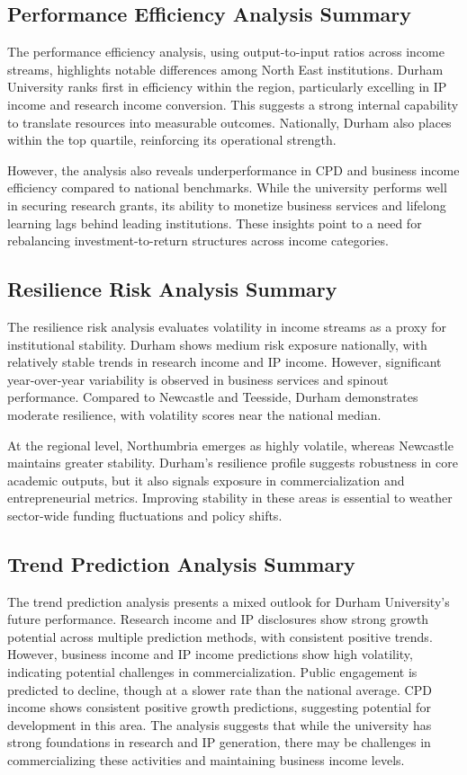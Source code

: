 \documentclass[journal,onecolumn, 10pt,draftclsnofoot]{IEEEtran}
\begin{document}
\subsection{Performance Efficiency Analysis Summary}

The performance efficiency analysis, using output-to-input ratios across income streams, highlights notable differences among North East institutions. Durham University ranks first in efficiency within the region, particularly excelling in IP income and research income conversion. This suggests a strong internal capability to translate resources into measurable outcomes. Nationally, Durham also places within the top quartile, reinforcing its operational strength.

However, the analysis also reveals underperformance in CPD and business income efficiency compared to national benchmarks. While the university performs well in securing research grants, its ability to monetize business services and lifelong learning lags behind leading institutions. These insights point to a need for rebalancing investment-to-return structures across income categories.

\subsection{Resilience Risk Analysis Summary}

The resilience risk analysis evaluates volatility in income streams as a proxy for institutional stability. Durham shows medium risk exposure nationally, with relatively stable trends in research income and IP income. However, significant year-over-year variability is observed in business services and spinout performance. Compared to Newcastle and Teesside, Durham demonstrates moderate resilience, with volatility scores near the national median.

At the regional level, Northumbria emerges as highly volatile, whereas Newcastle maintains greater stability. Durham's resilience profile suggests robustness in core academic outputs, but it also signals exposure in commercialization and entrepreneurial metrics. Improving stability in these areas is essential to weather sector-wide funding fluctuations and policy shifts.

\subsection{Trend Prediction Analysis Summary}

The trend prediction analysis presents a mixed outlook for Durham University's future performance. Research income and IP disclosures show strong growth potential across multiple prediction methods, with consistent positive trends. However, business income and IP income predictions show high volatility, indicating potential challenges in commercialization. Public engagement is predicted to decline, though at a slower rate than the national average. CPD income shows consistent positive growth predictions, suggesting potential for development in this area. The analysis suggests that while the university has strong foundations in research and IP generation, there may be challenges in commercializing these activities and maintaining business income levels.
\end{document}

